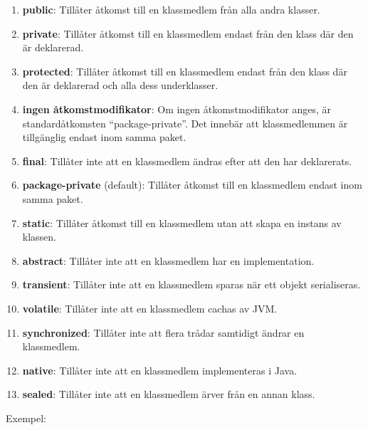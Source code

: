 \begin{enumerate}
\def\labelenumi{\arabic{enumi}.}
\tightlist
\item
  \textbf{public}: Tillåter åtkomst till en klassmedlem från alla andra
  klasser.
\item
  \textbf{private}: Tillåter åtkomst till en klassmedlem endast från den
  klass där den är deklarerad.
\item
  \textbf{protected}: Tillåter åtkomst till en klassmedlem endast från
  den klass där den är deklarerad och alla dess underklasser.
\item
  \textbf{ingen åtkomstmodifikator}: Om ingen åtkomstmodifikator anges,
  är standardåtkomsten ``package-private''. Det innebär att
  klassmedlemmen är tillgänglig endast inom samma paket.
\item
  \textbf{final}: Tillåter inte att en klassmedlem ändras efter att den
  har deklarerats.
\item
  \textbf{package-private} (default): Tillåter åtkomst till en
  klassmedlem endast inom samma paket.
\item
  \textbf{static}: Tillåter åtkomst till en klassmedlem utan att skapa
  en instans av klassen.
\item
  \textbf{abstract}: Tillåter inte att en klassmedlem har en
  implementation.
\item
  \textbf{transient}: Tillåter inte att en klassmedlem sparas när ett
  objekt serialiseras.
\item
  \textbf{volatile}: Tillåter inte att en klassmedlem cachas av JVM.
\item
  \textbf{synchronized}: Tillåter inte att flera trådar samtidigt ändrar
  en klassmedlem.
\item
  \textbf{native}: Tillåter inte att en klassmedlem implementeras i
  Java.
\item
  \textbf{sealed}: Tillåter inte att en klassmedlem ärver från en annan
  klass.
\end{enumerate}

Exempel:

\hypertarget{cb1}{}
\begin{Shaded}
\begin{Highlighting}[]
 \OperatorTok{\{}
     \OperatorTok{;} 
     \OperatorTok{;} 
     \OperatorTok{;} 
    \OperatorTok{;} 
\OperatorTok{\}}
\end{Highlighting}
\end{Shaded}

